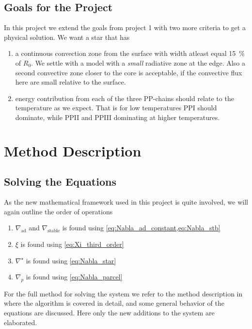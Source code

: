 \documentclass[11pt,a4paper,twocolumn,titlepage]{article}
\newcommand{\nablastb}
{
\nabla_{\text{stable}}
}
\newcommand{\nablaad}
{
\nabla_{\text{ad}}
}
\newcommand{\nablastar}
{
\nabla^\star
}
\newcommand{\nablap}
{
\nabla_{p}
}
\begin{document}
\subsection{Goals for the Project}\label{subsec:Governing/Goals}
In this project we extend the goals from project 1 with two more criteria to get a physical solution. We want a star that has
\begin{enumerate}[3.]
\item a continuous  convection zone from the surface with width atleast equal \SI{15}{\percent} of $R_0$. We settle with a model with a \textit{small} radiative zone at the edge. Also a second convective zone closer to the core is acceptable, if the convective flux here are small relative to the surface.

\item energy contribution from each of the three PP-chains should relate to the temperature as we expect. That is for low temperatures PPI should dominate, while PPII and PPIII dominating at higher temperatures.
\end{enumerate}
\section{Method Description}\label{sec:Method}
\subsection{Solving the Equations}\label{subsec:Method/Solving_equations}
As the new mathematical framework used in this project is quite involved, we will again outline the order of operations
\begin{enumerate}
\item $\nablaad$ and $\nablastb$ is found using \cref{eq:Nabla_ad_constant,eq:Nabla_stb}

\item $\xi$ is found using \cref{eq:Xi_third_order}

\item $\nablastar$ is found using \cref{eq:Nabla_star}

\item $\nablap$ is found using \cref{eq:Nabla_parcel}
\end{enumerate}

For the full method for solving the system we refer to the method description in \cite{Project1} where the algorithm is covered in detail, and some general behavior of the equations are discussed. Here only the new additions to the system are elaborated.
\end{document}
